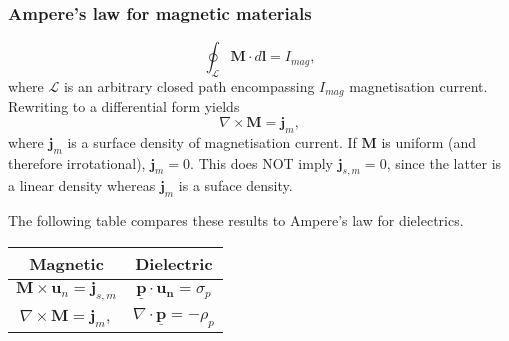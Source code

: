 \documentclass[a4paper, 12pt]{article}
\renewcommand{\vec}[1]{\mathbf{#1}}
\newcommand{\p}{\ensuremath{\vec{\underline{p}}}}
\renewcommand{\j}{\ensuremath{\vec{j}}}
\begin{document}
        \subsubsection{Ampere's law for magnetic materials}
            \begin{equation}
                \oint_\mathcal{L}\vec{M}\cdot d\vec{l} = I_{mag},
            \end{equation}
            where $\mathcal{L}$ is an arbitrary closed path encompassing $I_{mag}$ magnetisation current. Rewriting to a differential form yields
            \begin{equation}
                \nabla \times \vec{M} = \j_m,
            \end{equation}
            where $\j_m$ is a surface density of magnetisation current. If $\vec{M}$ is uniform (and therefore irrotational), $\j_m = 0$. This does NOT imply $\j_{s, m} = 0$, since the latter is a linear density whereas $\j_m$ is a suface density.

            The following table compares these results to Ampere's law for dielectrics.
            \begin{center}
                \begin{tabular}{ c|c } 
                Magnetic & Dielectric \\
                \hline
                 $\vec{M}\times\vec{u}_n = \j_{s, m}$ & $\p \cdot \vec{u_n} = \sigma_p$ \\[6px] 
                 $\nabla \times \vec{M} = \j_m,$ & $\nabla \cdot \p = -\rho_p$
                \end{tabular}
            \end{center}
        
\end{document}
